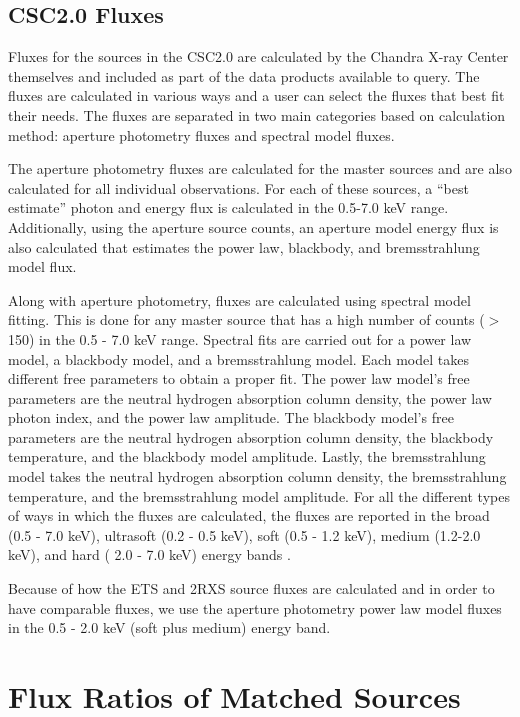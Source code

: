 \subsection{CSC2.0 Fluxes}

Fluxes for the sources in the CSC2.0 are calculated by the Chandra X-ray Center themselves and included as part of the data products available to query. 
The fluxes are calculated in various ways and a user can select the fluxes that best fit their needs.
The fluxes are separated in two main categories based on calculation method: aperture photometry fluxes and spectral model fluxes.

The aperture photometry fluxes are calculated for the master sources and are also calculated for all individual observations. 
For each of these sources, a “best estimate” photon and energy flux is calculated in the 0.5-7.0 keV range. 
Additionally, using the aperture source counts, an aperture model energy flux is also calculated that estimates the power law, blackbody, and bremsstrahlung model flux.

Along with aperture photometry, fluxes are calculated using spectral model fitting. 
This is done for any master source that has a high number of counts ($>$150) in the 0.5 - 7.0 keV range. 
Spectral fits are carried out for a power law model, a blackbody model, and a bremsstrahlung model. 
Each model takes different free parameters to obtain a proper fit. 
The power law model’s free parameters are the neutral hydrogen absorption column density, the power law photon index, and the power law amplitude.
The blackbody model’s free parameters are the neutral hydrogen absorption column density, the blackbody temperature, and the blackbody model amplitude. 
Lastly, the bremsstrahlung model takes the neutral hydrogen absorption column density, the bremsstrahlung temperature, and the bremsstrahlung model amplitude. 
For all the different types of ways in which the fluxes are calculated, the fluxes are reported in the broad (0.5 - 7.0 keV), ultrasoft (0.2 - 0.5 keV), soft (0.5 - 1.2 keV), medium (1.2-2.0 keV), and hard ( 2.0 - 7.0 keV) energy bands \citep{Evans2020}.

Because of how the ETS and 2RXS source fluxes are calculated and in order to have comparable fluxes, we use the aperture photometry power law model fluxes in the 0.5 - 2.0 keV (soft plus medium) energy band.


\section{Flux Ratios of Matched Sources}


